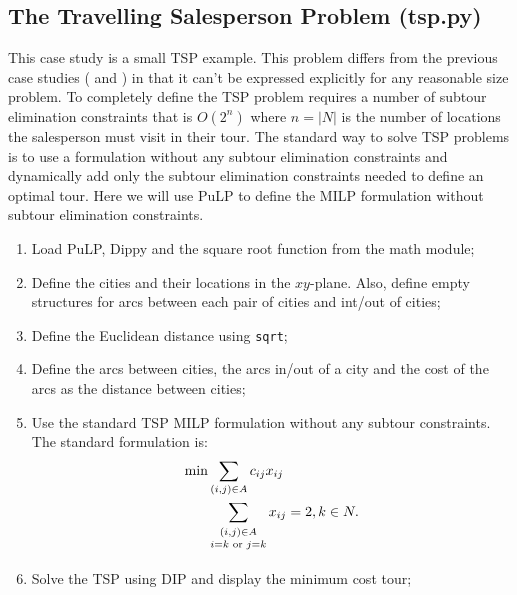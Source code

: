 
\subsection{The Travelling Salesperson Problem (tsp.py)} \label{sbs:tsp}

This case study is a small \acf{TSP} example. This problem differs from the previous case studies ( and ) in that it can't be expressed explicitly for any reasonable size problem. To completely define the \ac{TSP} problem requires a number of subtour elimination constraints that is $O(2^n)$ where $n = |N|$ is the number of locations the salesperson must visit in their tour. The standard way to solve \ac{TSP} problems is to use a formulation without any subtour elimination constraints and dynamically add only the subtour elimination constraints needed to define an optimal tour. Here we will use PuLP to define the \ac{MILP} formulation without subtour elimination constraints.

\begin{enumerate}
\item Load PuLP, Dippy and the square root function from the math module;


\newpage

\item Define the cities and their locations in the $xy$-plane. Also, define empty structures for arcs between each pair of cities and int/out of cities;


\item Define the Euclidean distance using {\tt sqrt};


\item Define the arcs between cities, the arcs in/out of a city and the cost of the arcs as the distance between cities;


\item Use the standard \ac{TSP} \ac{MILP} formulation without any subtour constraints. The standard formulation is:
\begin{align*}
\min & \sum_{(i, j) \in A} c_{ij} x_{ij} \\
     & \sum_{\twosubs{(i, j) \in A}{i = k \text{ or } j = k}} x_{ij} = 2, k \in N.
\end{align*}



\item  Solve the \ac{TSP} using \ac{DIP} and display the minimum cost tour;


\end{enumerate}

